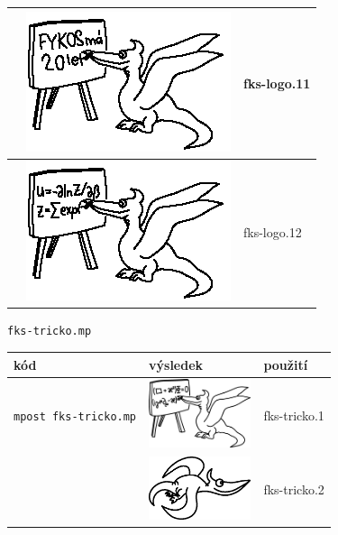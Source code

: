 \documentclass[a4paper,10pt]{article}
\begin{document}
\begin{tabularx}{\textwidth}{|l|l|X|}
    &\includegraphics{fks-logo_11}& fks-logo.11\\\hline
    &\includegraphics{fks-logo_12}& fks-logo.12\\\hline
\end{tabularx}\bigskip

{\centering\large\texttt{fks-tricko.mp}\nopagebreak\\\vspace{-12pt}\noindent}
\begin{tabularx}{\textwidth}{|l|l|X|}\hline
    kód & výsledek & použití\\\hline
    \verb+mpost fks-tricko.mp+ & \includegraphics[width=3cm]{fks-tricko_1} & 
	fks-tricko.1
{} {} {} {} {} {} {} {} {} {} {} {} {} {} {} {} {} {} {} {} {} {} {} {} {} {} {} {} {} {} {} {} {} {} {} {} {} {} {} {} {} {} {} {} {} {} {} {} {} {} {} {} {} {} {} {} {} {} {} {} {} {} {} {} {} {} {} {} {} {} {} {} {} {} {} {} {} {} {} {} {} {} {} {} {} {} {} {} {} {} {} {} {} {} {} {} {} {} {} {} {} {} {} {} {} {} {} {} {} {} {} {} {} {} {} {} {} {} {} {} {} {} {} {} {} {} {} {}
\\\hline
    & \includegraphics[width=3cm]{fks-tricko_2} & fks-tricko.2\\\hline
\end{tabularx}\bigskip
\end{document}
